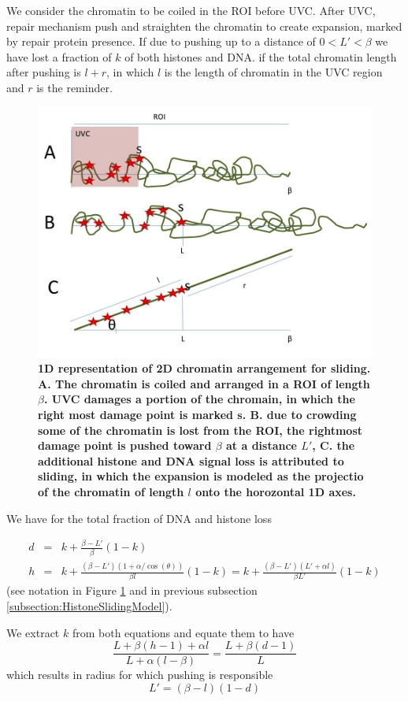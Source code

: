 \documentclass[12pt]{report}
\begin{document}
		We consider the chromatin to be coiled in the ROI before UVC. After UVC, repair mechanism push and straighten the chromatin to create expansion, marked by repair protein presence. 
	    If due to pushing up to a distance of $0<L'<\beta$ we have lost a fraction of $k$ of both histones and DNA. if the total chromatin length after pushing is $l+r$, in which $l$ is the length of chromatin in the UVC region and $r$ is the reminder.
	    \begin{figure}[H]
	    	\centering
	    	\includegraphics[width=0.5\linewidth, height=0.3\textheight]{Images/SlidingModel/2DmodelWithChromatinLength}
	    	\caption{\tiny{\textbf{1D representation of 2D chromatin arrangement for sliding. A. The chromatin  is coiled and arranged in a ROI of length $\beta$. UVC damages a portion of the chromain, in which the right most damage point is marked s. B. due to crowding some of the chromatin is lost from the ROI, the rightmost damage point is pushed toward $\beta$ at a distance $L'$, C. the additional histone and DNA signal loss is attributed to sliding, in which the expansion is modeled as the projectio of the chromatin of length $l$ onto the horozontal 1D axes.}}}
	    	\label{fig:2DmodelWithChromatinLength}
	    \end{figure}
	   
	    We have for the total fraction of DNA and histone loss
                           
		\begin{eqnarray*}
			d &=& k+\frac{\beta-L'}{\beta}(1-k) \\
			h &=& k+\frac{(\beta-L')(1+\alpha / \cos(\theta))}{\beta l}(1-k)= k+\frac{(\beta-L')(L'+\alpha l)}{\beta L'}(1-k)
		\end{eqnarray*}
		(see notation in Figure \ref{fig:2DmodelWithChromatinLength} and in previous subsection \ref{subsection:HistoneSlidingModel}). 		
		
        We extract $k$ from both equations and equate them to have 
        \begin{equation*}       
        \frac{L +\beta(h-1)+\alpha l}{L+\alpha (l-\beta)} =\frac{L+\beta(d-1)}{L}
        \end{equation*}
     	which results in radius for which pushing is responsible
     	\begin{equation*}
     	L' = (\beta-l)(1-d)
     	\end{equation*}
     	
\end{document}

